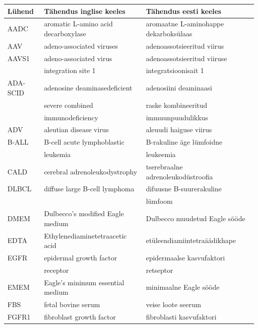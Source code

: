 \documentclass{trkut}%
\begin{document}
\maketitle%
\tableofcontents%

\nummerdame
\togglefalse{nummerdamelehti}
\pagestyle{empty}

\setlength\tabcolsep{0 pt}

\begin{center}
	\begin{longtable}{p{2.5cm} p{7.3cm} p{6cm}}
		Lühend & Tähendus inglise keeles & Tähendus eesti keeles \\ \hline
		AADC & aromatic L-amino acid decarboxylase & aromaatne L-aminohappe dekarboksülaas \\
		AAV & adeno-associated viruses & adenoassotsieeritud viirus \\
		AAVS1 & adeno-associated virus & adenoassotsieeritud viiruse \\
		& integration site 1 & integratsioonisait 1 \\
		ADA-SCID & adenosine deaminasedeficient & adenosiini deaminaasi \\
		& severe combined & raske kombineeritud \\
		& immunodeficiency & immuunpuudulikkus \\
		ADV & aleutian disease virus & aleuudi haiguse viirus \\
		B-ALL & B-cell acute lymphoblastic & B-rakuline äge lümfoidne \\
		& leukemia & leukeemia \\
		CALD & cerebral adrenoleukodystrophy & tserebraalne adrenoleukodüstroofia \\
		DLBCL & diffuse large B-cell lymphoma & difuusne B-suurerakuline \\
		& & lümfoom \\
		DMEM & Dulbecco's modified Eagle medium & Dulbecco muudetud Eagle sööde \\
		EDTA & Ethylenediaminetetraacetic acid & etüleendiamiintetraäädikhape \\
		EGFR & epidermal growth factor & epidermaalse kasvufaktori \\
		& receptor & retseptor \\
		EMEM & Eagle's minimum essential medium & minimaalne Eagle sööde \\
		FBS & fetal bovine serum & veise loote seerum \\
		FGFR1 & fibroblast growth factor & fibroblasti kasvufaktori \\

\end{longtable}
\end{center}
\end{document}

